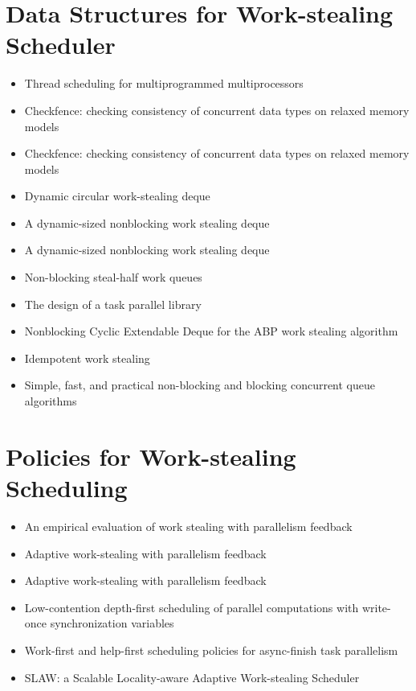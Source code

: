 \section{Data Structures for Work-stealing Scheduler}
\label{sec:lr-data-structures-for-work-stealing-scheduler}

\begin{itemize}
\item Thread scheduling for multiprogrammed multiprocessors
  \cite{Arora2001}
\item Checkfence: checking consistency of concurrent data types on
  relaxed memory models \cite{Burckhardt2007}
\item Checkfence: checking consistency of concurrent data types on
  relaxed memory models \cite{Burckhardt2007a}
\item Dynamic circular work-stealing deque \cite{Chase2005}
\item A dynamic-sized nonblocking work stealing deque
  \cite{Hendler2006}
\item A dynamic-sized nonblocking work stealing deque
  \cite{Hendler2006a}
\item Non-blocking steal-half work queues \cite{Hendler2002}
\item The design of a task parallel library \cite{Leijen2009}
\item Nonblocking Cyclic Extendable Deque for the ABP work stealing
  algorithm \cite{Lev2005}
\item Idempotent work stealing \cite{Michael2009}
\item Simple, fast, and practical non-blocking and blocking concurrent
  queue algorithms \cite{Michael1996}
\end{itemize}


\section{Policies for Work-stealing Scheduling}
\label{sec:lr-policies-for-work-stealing-scheduling}

\begin{itemize}
\item An empirical evaluation of work stealing with parallelism
  feedback \cite{Agrawal2006}
\item Adaptive work-stealing with parallelism feedback
  \cite{Agrawal2008}
\item Adaptive work-stealing with parallelism feedback
  \cite{Agrawal2008a}
\item Low-contention depth-first scheduling of parallel computations
  with write-once synchronization variables \cite{Fatourou2001}
\item Work-first and help-first scheduling policies for async-finish
  task parallelism \cite{Guo2009}
\item SLAW: a Scalable Locality-aware Adaptive Work-stealing Scheduler
  \cite{Guo2010}
\end{itemize}


